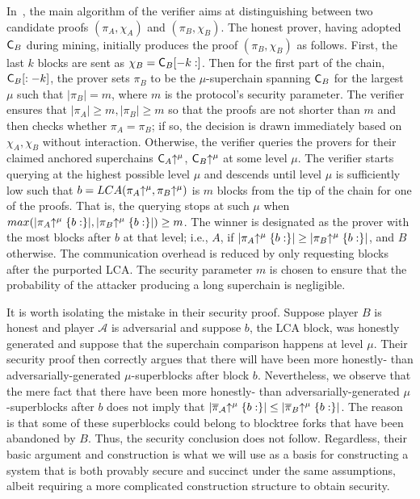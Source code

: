 In~\cite{popow}, the main algorithm of the verifier aims at distinguishing
between two candidate proofs $(\pi_A, \chi_A)$ and $(\pi_B, \chi_B)$. The honest
prover, having adopted $\mathsf{C}_B$ during mining, initially produces the proof
$(\pi_B, \chi_B)$ as follows. First, the last $k$ blocks are sent as $\chi_B =
\mathsf{C}_B[-k:]$. Then for the first part of the chain, $\mathsf{C}_B[:-k]$, the
prover sets $\pi_B$ to be the $\mu$-superchain spanning $\mathsf{C}_B$ for the
largest $\mu$ such that $|\pi_B| = m$, where $m$ is the protocol's security
parameter. The verifier ensures that $|\pi_A| \geq m, |\pi_B| \geq m$ so that
the proofs are not shorter than $m$ and then checks whether $\pi_A = \pi_B$; if
so, the decision is drawn immediately based on $\chi_A,\chi_B$ without
interaction. Otherwise, the verifier queries the provers for their claimed
anchored superchains $\mathsf{C}_A\negthickspace\uparrow^\mu$, $\mathsf{C}_B\negthickspace\uparrow^\mu$ at some
level $\mu$. The verifier starts querying at the highest possible level $\mu$
and descends until level $\mu$ is sufficiently low such that $b =
LCA(\pi_A\negthickspace\uparrow^\mu, \pi_B\negthickspace\uparrow^\mu)$ is $m$ blocks from the tip of the
chain for one of the proofs. That is, the querying stops at such $\mu$ when
$max(|\pi_A\negthickspace\uparrow^\mu\{b:\}|, |\pi_B\negthickspace\uparrow^\mu\{b:\}|) \geq m$. The winner
is designated as the prover with the most blocks after $b$ at that level; i.e.,
$A$, if $|\pi_A\negthickspace\uparrow^\mu\{b:\}| \geq |\pi_B\negthickspace\uparrow^\mu\{b:\}|$, and $B$
otherwise. The communication overhead is reduced by only requesting blocks after
the purported LCA. The security parameter $m$ is chosen to ensure that the
probability of the attacker producing a long superchain is negligible.

It is worth isolating the mistake in their security proof. Suppose player $B$ is
honest and player $\mathcal{A}$ is adversarial and suppose $b$, the LCA block,
was honestly generated and suppose that the superchain comparison happens at
level $\mu$. Their security proof then correctly argues that there will have
been more honestly- than adversarially-generated $\mu$-superblocks after block
$b$. Nevertheless, we observe that the mere fact that there have been more
honestly- than adversarially-generated $\mu$-superblocks after $b$ does not
imply that $|\overline\pi_\mathcal{A}\negthickspace\uparrow^\mu\{b:\}| \leq
|\overline\pi_B\negthickspace\uparrow^\mu\{b:\}|$. The reason is that some of these
superblocks could belong to blocktree forks that have been abandoned by $B$.
Thus, the security conclusion does not follow. Regardless, their basic argument
and construction is what we will use as a basis for constructing a system that
is both provably secure and succinct under the same assumptions, albeit
requiring a more complicated construction structure to obtain security.
